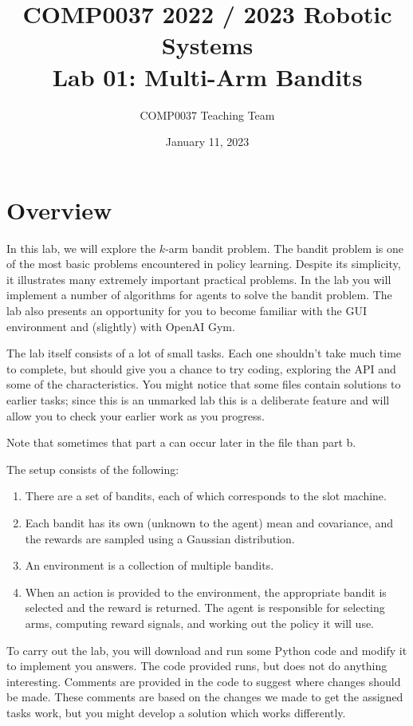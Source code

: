 \documentclass[twoside]{ucl_exam}
\title{COMP0037 2022 / 2023 Robotic Systems\\Lab 01: Multi-Arm Bandits}
\author{COMP0037 Teaching Team}
\date{January 11, 2023}
\begin{document}
\maketitle

\section*{Overview}

In this lab, we will explore the $k$-arm bandit problem. The bandit
problem is one of the most basic problems encountered in policy
learning. Despite its simplicity, it illustrates many extremely
important practical problems. In the lab you will implement a number
of algorithms for agents to solve the bandit problem. The lab also
presents an opportunity for you to become familiar with the GUI
environment and (slightly) with OpenAI Gym.

The lab itself consists of a lot of small tasks. Each one shouldn't
take much time to complete, but should give you a chance to try
coding, exploring the API and some of the characteristics. You might
notice that some files contain solutions to earlier tasks; since this
is an unmarked lab this is a deliberate feature and will allow you to
check your earlier work as you progress.

Note that sometimes that part a can occur later in the file than part
b.

The setup consists of the following:

\begin{enumerate}
\item There are a set of bandits, each of which corresponds to the slot machine.

\item Each bandit has its own (unknown to the agent)
  mean and covariance, and the rewards are sampled using a Gaussian distribution.

\item An environment is a collection of multiple bandits.

\item When an action is provided
to the environment, the appropriate bandit is selected and the reward is
returned. The agent is responsible for selecting arms, computing reward signals,
and working out the policy it will use.

\end{enumerate}

To carry out the lab, you will download and run some Python code and modify it
to implement you answers. The code provided runs, but does not do anything
interesting. Comments are provided in the code to suggest where changes should
be made. These comments are based on the changes we made to get the assigned
tasks work, but you might develop a solution which works differently.
\end{document}
